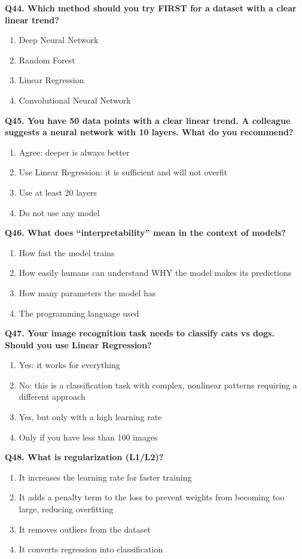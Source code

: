 \documentclass[12pt, a4paper]{article}
\newcommand{\question}[1]{\vspace{0.6em}\noindent\textbf{#1}}
\begin{document}
\question{Q44. Which method should you try FIRST for a dataset with a clear linear trend?}
\begin{enumerate}[label=\alph*)]
    \item Deep Neural Network
    \item Random Forest
    \item Linear Regression
    \item Convolutional Neural Network
\end{enumerate}

\question{Q45. You have 50 data points with a clear linear trend. A colleague suggests a neural network with 10 layers. What do you recommend?}
\begin{enumerate}[label=\alph*)]
    \item Agree: deeper is always better
    \item Use Linear Regression: it is sufficient and will not overfit
    \item Use at least 20 layers
    \item Do not use any model
\end{enumerate}

\question{Q46. What does ``interpretability'' mean in the context of models?}
\begin{enumerate}[label=\alph*)]
    \item How fast the model trains
    \item How easily humans can understand WHY the model makes its predictions
    \item How many parameters the model has
    \item The programming language used
\end{enumerate}

\question{Q47. Your image recognition task needs to classify cats vs dogs. Should you use Linear Regression?}
\begin{enumerate}[label=\alph*)]
    \item Yes: it works for everything
    \item No: this is a classification task with complex, nonlinear patterns requiring a different approach
    \item Yes, but only with a high learning rate
    \item Only if you have less than 100 images
\end{enumerate}

\question{Q48. What is regularization (L1/L2)?}
\begin{enumerate}[label=\alph*)]
    \item It increases the learning rate for faster training
    \item It adds a penalty term to the loss to prevent weights from becoming too large, reducing overfitting
    \item It removes outliers from the dataset
    \item It converts regression into classification
\end{enumerate}
\end{document}
